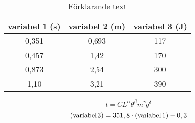 




\begin{table}[ht]
\centering
    \begin{tabular}{c | c | c}
        \hline
        variabel 1 (s) & variabel 2 (m) & variabel 3 (J) \\
        \hline
        0,351 &	0,693 &	117 \\
        0,457 &	1,42 &	170 \\
        0,873 &	2,54 &	300 \\
        1,10 &	3,21 &	390 \\
        \hline
     \end{tabular} 
\caption{Förklarande text}
\label{tvariabel123}
\end{table}

\begin{equation}
t = C L^\alpha \theta^\beta m^\gamma g^\delta
\end{equation}
\begin{equation}
{\rm (variabel \, 3)} = 351,8 \cdot {\rm (variabel \, 1)} - 0,3
\end{equation}

